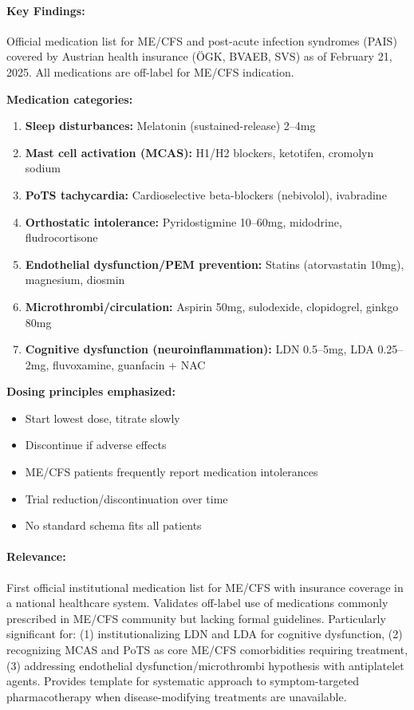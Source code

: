
\paragraph{Key Findings:}
Official medication list for ME/CFS and post-acute infection syndromes (PAIS) covered by Austrian health insurance (ÖGK, BVAEB, SVS) as of February 21, 2025. All medications are off-label for ME/CFS indication.

\textbf{Medication categories:}
\begin{enumerate}
    \item \textbf{Sleep disturbances:} Melatonin (sustained-release) 2--4mg
    \item \textbf{Mast cell activation (MCAS):} H1/H2 blockers, ketotifen, cromolyn sodium
    \item \textbf{PoTS tachycardia:} Cardioselective beta-blockers (nebivolol), ivabradine
    \item \textbf{Orthostatic intolerance:} Pyridostigmine 10--60mg, midodrine, fludrocortisone
    \item \textbf{Endothelial dysfunction/PEM prevention:} Statins (atorvastatin 10mg), magnesium, diosmin
    \item \textbf{Microthrombi/circulation:} Aspirin 50mg, sulodexide, clopidogrel, ginkgo 80mg
    \item \textbf{Cognitive dysfunction (neuroinflammation):} LDN 0.5--5mg, LDA 0.25--2mg, fluvoxamine, guanfacin + NAC
\end{enumerate}

\textbf{Dosing principles emphasized:}
\begin{itemize}
    \item Start lowest dose, titrate slowly
    \item Discontinue if adverse effects
    \item ME/CFS patients frequently report medication intolerances
    \item Trial reduction/discontinuation over time
    \item No standard schema fits all patients
\end{itemize}

\paragraph{Relevance:}
First official institutional medication list for ME/CFS with insurance coverage in a national healthcare system. Validates off-label use of medications commonly prescribed in ME/CFS community but lacking formal guidelines. Particularly significant for: (1) institutionalizing LDN and LDA for cognitive dysfunction, (2) recognizing MCAS and PoTS as core ME/CFS comorbidities requiring treatment, (3) addressing endothelial dysfunction/microthrombi hypothesis with antiplatelet agents. Provides template for systematic approach to symptom-targeted pharmacotherapy when disease-modifying treatments are unavailable.

